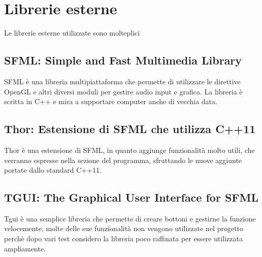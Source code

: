 \section{Librerie esterne}
Le librerie esterne utilizzate sono molteplici
\subsection{SFML: Simple and Fast Multimedia Library}
SFML è una libreria multipiattaforma che permette di utilizzare le direttive OpenGL e altri diversi moduli per gestire audio input e grafica. La libreria è scritta in C++ e mira a supportare computer anche di vecchia data.
\subsection{Thor: Estensione di SFML che utilizza C++11}
Thor è una estensione di SFML, in quanto aggiunge funzionalità molto utili, che verranno espresse nella sezione del programma, sfruttando le nuove aggiunte portate dallo standard C++11.
\subsection{TGUI: The Graphical User Interface for SFML}
Tgui è una semplice libreria che permette di creare bottoni e gestirne la funzione velocemente, molte delle sue funzionalità non vengono utilizzate nel progetto perchè dopo vari test considero la libreria poco raffinata per essere utilizzata ampliamente.